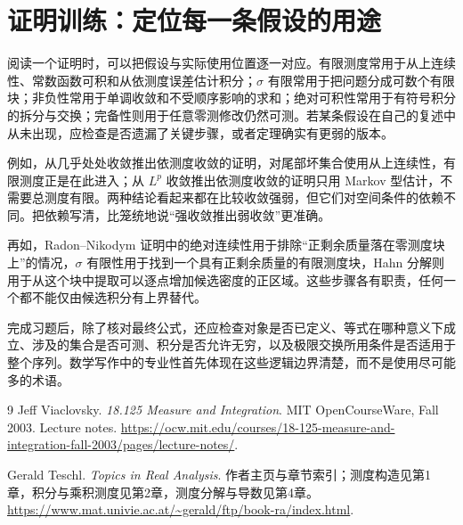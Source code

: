 \documentclass[UTF8,12pt,a4paper,fontset=fandol]{ctexbook}
\begin{document}
\section{证明训练：定位每一条假设的用途}
阅读一个证明时，可以把假设与实际使用位置逐一对应。有限测度常用于从上连续性、常数函数可积和从依测度误差估计积分；$\sigma$ 有限常用于把问题分成可数个有限块；非负性常用于单调收敛和不受顺序影响的求和；绝对可积性常用于有符号积分的拆分与交换；完备性则用于任意零测修改仍然可测。若某条假设在自己的复述中从未出现，应检查是否遗漏了关键步骤，或者定理确实有更弱的版本。

例如，从几乎处处收敛推出依测度收敛的证明，对尾部坏集合使用从上连续性，有限测度正是在此进入；从 $L^p$ 收敛推出依测度收敛的证明只用 Markov 型估计，不需要总测度有限。两种结论看起来都在比较收敛强弱，但它们对空间条件的依赖不同。把依赖写清，比笼统地说“强收敛推出弱收敛”更准确。

再如，Radon--Nikodym 证明中的绝对连续性用于排除“正剩余质量落在零测度块上”的情况，$\sigma$ 有限性用于找到一个具有正剩余质量的有限测度块，Hahn 分解则用于从这个块中提取可以逐点增加候选密度的正区域。这些步骤各有职责，任何一个都不能仅由候选积分有上界替代。

完成习题后，除了核对最终公式，还应检查对象是否已定义、等式在哪种意义下成立、涉及的集合是否可测、积分是否允许无穷，以及极限交换所用条件是否适用于整个序列。数学写作中的专业性首先体现在这些逻辑边界清楚，而不是使用尽可能多的术语。

\begin{thebibliography}{9}
Jeff Viaclovsky.
\emph{18.125 Measure and Integration}.
MIT OpenCourseWare, Fall 2003. Lecture notes.
\url{https://ocw.mit.edu/courses/18-125-measure-and-integration-fall-2003/pages/lecture-notes/}.

Gerald Teschl.
\emph{Topics in Real Analysis}.
作者主页与章节索引；测度构造见第1章，积分与乘积测度见第2章，测度分解与导数见第4章。
\url{https://www.mat.univie.ac.at/~gerald/ftp/book-ra/index.html}.
\end{thebibliography}
\end{document}

